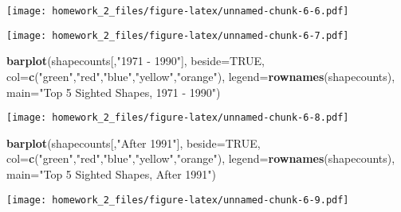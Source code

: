 \documentclass[
]{article}
\newenvironment{Shaded}{\begin{snugshade}}{\end{snugshade}}
\newcommand{\DataTypeTok}[1]{\textcolor[rgb]{0.13,0.29,0.53}{#1}}
\newcommand{\KeywordTok}[1]{\textcolor[rgb]{0.13,0.29,0.53}{\textbf{#1}}}
\newcommand{\NormalTok}[1]{#1}
\newcommand{\OperatorTok}[1]{\textcolor[rgb]{0.81,0.36,0.00}{\textbf{#1}}}
\newcommand{\OtherTok}[1]{\textcolor[rgb]{0.56,0.35,0.01}{#1}}
\newcommand{\StringTok}[1]{\textcolor[rgb]{0.31,0.60,0.02}{#1}}
\begin{document}
\texttt{[image: homework\_2\_files/figure-latex/unnamed-chunk-6-6.pdf]}

\begin{Shaded}
\end{Shaded}

\texttt{[image: homework\_2\_files/figure-latex/unnamed-chunk-6-7.pdf]}

\begin{Shaded}
\begin{Highlighting}[]
\KeywordTok{barplot}\NormalTok{(shapecounts[,}\StringTok{"1971 - 1990"}\NormalTok{], }\DataTypeTok{beside=}\OtherTok{TRUE}\NormalTok{, }\DataTypeTok{col=}\KeywordTok{c}\NormalTok{(}\StringTok{"green"}\NormalTok{,}\StringTok{"red"}\NormalTok{,}\StringTok{"blue"}\NormalTok{,}\StringTok{"yellow"}\NormalTok{,}\StringTok{"orange"}\NormalTok{),}
        \DataTypeTok{legend=}\KeywordTok{rownames}\NormalTok{(shapecounts), }\DataTypeTok{main=}\StringTok{"Top 5 Sighted Shapes, 1971 - 1990"}\NormalTok{)}
\end{Highlighting}
\end{Shaded}

\texttt{[image: homework\_2\_files/figure-latex/unnamed-chunk-6-8.pdf]}

\begin{Shaded}
\begin{Highlighting}[]
\KeywordTok{barplot}\NormalTok{(shapecounts[,}\StringTok{"After 1991"}\NormalTok{], }\DataTypeTok{beside=}\OtherTok{TRUE}\NormalTok{, }\DataTypeTok{col=}\KeywordTok{c}\NormalTok{(}\StringTok{"green"}\NormalTok{,}\StringTok{"red"}\NormalTok{,}\StringTok{"blue"}\NormalTok{,}\StringTok{"yellow"}\NormalTok{,}\StringTok{"orange"}\NormalTok{),}
        \DataTypeTok{legend=}\KeywordTok{rownames}\NormalTok{(shapecounts), }\DataTypeTok{main=}\StringTok{"Top 5 Sighted Shapes, After 1991"}\NormalTok{)}
\end{Highlighting}
\end{Shaded}

\texttt{[image: homework\_2\_files/figure-latex/unnamed-chunk-6-9.pdf]}
\end{document}
